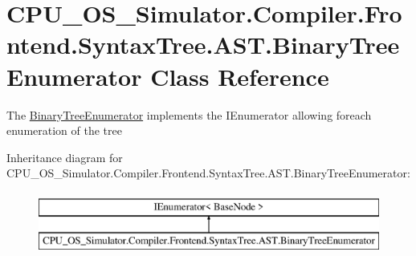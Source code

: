 \hypertarget{class_c_p_u___o_s___simulator_1_1_compiler_1_1_frontend_1_1_syntax_tree_1_1_a_s_t_1_1_binary_tree_enumerator}{}\section{C\+P\+U\+\_\+\+O\+S\+\_\+\+Simulator.\+Compiler.\+Frontend.\+Syntax\+Tree.\+A\+S\+T.\+Binary\+Tree\+Enumerator Class Reference}
\label{class_c_p_u___o_s___simulator_1_1_compiler_1_1_frontend_1_1_syntax_tree_1_1_a_s_t_1_1_binary_tree_enumerator}


The \hyperlink{class_c_p_u___o_s___simulator_1_1_compiler_1_1_frontend_1_1_syntax_tree_1_1_a_s_t_1_1_binary_tree_enumerator}{Binary\+Tree\+Enumerator} implements the I\+Enumerator allowing foreach enumeration of the tree  


Inheritance diagram for C\+P\+U\+\_\+\+O\+S\+\_\+\+Simulator.\+Compiler.\+Frontend.\+Syntax\+Tree.\+A\+S\+T.\+Binary\+Tree\+Enumerator\+:\begin{figure}[H]
\begin{center}
\leavevmode
\includegraphics[height=2.000000cm]{class_c_p_u___o_s___simulator_1_1_compiler_1_1_frontend_1_1_syntax_tree_1_1_a_s_t_1_1_binary_tree_enumerator}
\end{center}
\end{figure}
